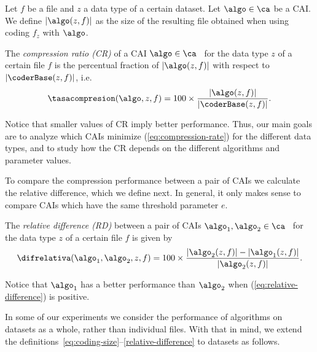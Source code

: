 \vspace{+2pt}
\begin{defcion}
\label{eq:coding-size}
Let $f$ be a file and $z$ a data type of a certain dataset. Let $\algo \in \ca$ be a CAI. We define $|\algo(z, f)|$ as the size of the resulting file obtained when using coding $f_z$ with $\algo$.
\end{defcion}


\vspace{+2pt}
\begin{defcion}
The \textit{compression ratio (CR)} of a CAI $\algo \in \ca$ \ for the data type $z$ of a certain file $f$ is the percentual fraction of $|\algo(z, f)|$ with respect to $|\coderBase(z, f)|$, i.e.
\vspace{-5pt}
\begin{equation}
\label{eq:compression-rate}
\tasacompresion(\algo, z, f) = 100\times\frac{|\algo(z, f)|}{|\coderBase(z, f)|}.
\end{equation}
\end{defcion}


Notice that smaller values of CR imply better performance. Thus, our main goals are to analyze which CAIs minimize (\ref{eq:compression-rate}) for the different data types, and to study how the CR depends on the different algorithms and parameter values.


To compare the compression performance between a pair of CAIs we calculate the relative difference, which we define next. In general, it only makes sense to compare CAIs which have the same threshold parameter $e$.


\vspace{+5pt}
\begin{defcion}
\label{relative-difference}
The \textit{relative difference (RD)} between a pair of CAIs $\algo_1, \algo_2 \in {\ca}$ \ for the data type $z$ of a certain file $f$ is given by
\vspace{-5pt}
\begin{equation}
\label{eq:relative-difference}
\difrelativa(\algo_1, \algo_2, z, f)  =
100\times\frac{|\algo_2 (z, f)| - |\algo_1 (z, f)|}{ |\algo_2 (z, f)| }.
\end{equation}
\end{defcion}


Notice that $\algo_1$ has a better performance than $\algo_2$ when (\ref{eq:relative-difference}) is positive.


\vspace{+3pt}
In some of our experiments we consider the performance of algorithms on datasets as a whole, rather than individual files. With that in mind, we extend the definitions~\ref{eq:coding-size}--\ref{relative-difference} to datasets as follows.


